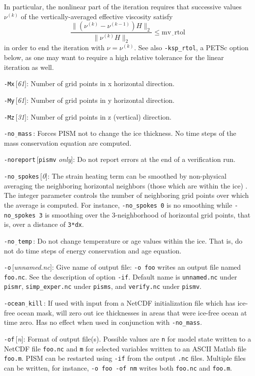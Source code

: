 \documentclass[11pt,final]{amsart}
\newcommand{\rawopt}[1]{\vspace{1mm}\noindent \Large\texttt{-#1}\normalsize}
\newcommand{\opt}[1]{\rawopt{#1}\,:\quad}
\newcommand{\optdef}[2]{\rawopt{#1}\,[\textsl{#2}]:\quad}
\newcommand{\optrestrict}[2]{\rawopt{#1}\,[\texttt{#2} \textsl{only}]:\quad}
\newcommand{\und}{$\underline{\,\,\,}$}
\begin{document}
In particular, the nonlinear part of the iteration requires that successive values $\nu^{(k)}$ of the vertically-averaged effective viscosity satisfy
	$$\frac{\|(\nu^{(k)} - \nu^{(k-1)}) H\|_2}{\|\nu^{(k)} H\|_2} \le \text{mv\und rtol}$$
in order to end the iteration with $\nu = \nu^{(k)}$.  See also \verb|-ksp_rtol|, a PETSc option below, as one may want to require a high relative tolerance for the linear iteration as well.

\optdef{Mx}{61}  Number of grid points in x horizontal direction.

\optdef{My}{61}  Number of grid points in y horizontal direction.

\optdef{Mz}{31}  Number of grid points in z (vertical) direction.

\opt{no\und mass}  Forces PISM not to change the ice thickness.  No time steps of the mass conservation equation are computed.

\optrestrict{noreport}{pismv}  Do not report errors at the end of a verification run.

\optdef{no\und spokes}{0}  The strain heating term can be smoothed by non-physical averaging the neighboring horizontal neighbors (those which are within the ice) \cite{BBL}.  The integer parameter controls the number of neighboring grid points over which the average is computed.  For instance, \verb|-no_spokes 0| is no smoothing while \verb|-no_spokes 3| is smoothing over the 3-neighborhood of horizontal grid points, that is, over a distance of \verb|3*dx|.

\opt{no\und temp}  Do not change temperature or age values within the ice.  That is, do not do time steps of energy conservation and age equation.

\optdef{o}{unnamed.nc} Give name of output file: \verb|-o foo| writes an output file named \verb|foo.nc|.  See the description of option \verb|-if|.  Default name is \verb|unnamed.nc| under \verb|pismr|, \verb|simp_exper.nc| under \verb|pisms|, and \verb|verify.nc| under \verb|pismv|.

\opt{ocean\und kill}  If used with input from a NetCDF initialization file which has ice-free ocean mask, will zero out ice thicknesses in areas that were ice-free ocean at time zero.  Has no effect when used in conjunction with \verb|-no_mass|.

\optdef{of}{n}  Format of output file(s).  Possible values are \verb|n| for model state written to a NetCDF file \verb|foo.nc| and \verb|m| for selected variables written to an ASCII Matlab file \verb|foo.m|.  PISM can be restarted using \verb|-if| from the output \verb|.nc| files.  Multiple files can be written, for instance, \verb|-o foo -of nm| writes both \verb|foo.nc| and \verb|foo.m|.
\end{document}
